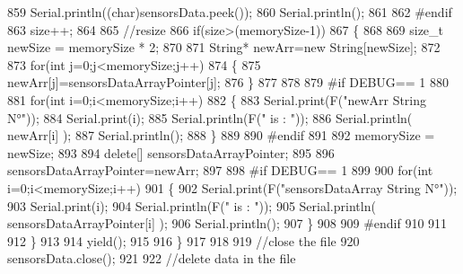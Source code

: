 \begin{DoxyCode}
859             Serial.println((\textcolor{keywordtype}{char})sensorsData.peek());
860             Serial.println();           
861             
862 \textcolor{preprocessor}{        #endif}
863             size++;
864             
865             \textcolor{comment}{//resize}
866             \textcolor{keywordflow}{if}(size>(memorySize-1))
867             \{
868                 
869                 \textcolor{keywordtype}{size\_t} newSize = memorySize * 2;
870                 
871                 String* newArr=\textcolor{keyword}{new} String[newSize];
872                 
873                 \textcolor{keywordflow}{for}(\textcolor{keywordtype}{int} j=0;j<memorySize;j++)
874                 \{
875                     newArr[j]=sensorsDataArrayPointer[j];               
876                 \}
877 
878             
879 \textcolor{preprocessor}{            #if DEBUG== 1}
880             
881                 \textcolor{keywordflow}{for}(\textcolor{keywordtype}{int} i=0;i<memorySize;i++)
882                 \{               
883                     Serial.print(F(\textcolor{stringliteral}{"newArr String N°"}));
884                     Serial.print(i);
885                     Serial.println(F(\textcolor{stringliteral}{" is : "}));
886                     Serial.println( newArr[i] );
887                     Serial.println();   
888                 \}       
889             
890 \textcolor{preprocessor}{            #endif}
891 
892                 memorySize = newSize;       
893         
894                 \textcolor{keyword}{delete}[] sensorsDataArrayPointer;
895                 
896                 sensorsDataArrayPointer=newArr;         
897                 
898 \textcolor{preprocessor}{            #if DEBUG== 1}
899         
900                 \textcolor{keywordflow}{for}(\textcolor{keywordtype}{int} i=0;i<memorySize;i++)
901                 \{               
902                     Serial.print(F(\textcolor{stringliteral}{"sensorsDataArray String N°"}));
903                     Serial.print(i);
904                     Serial.println(F(\textcolor{stringliteral}{" is : "}));
905                     Serial.println( sensorsDataArrayPointer[i] );
906                     Serial.println();   
907                 \}       
908             
909 \textcolor{preprocessor}{            #endif}
910 
911             
912             \}
913             
914             yield();
915 
916         \}
917         
918                     
919         \textcolor{comment}{//close the file}
920         sensorsData.close();
921 
922         \textcolor{comment}{//delete data in the file}

\end{DoxyCode}
